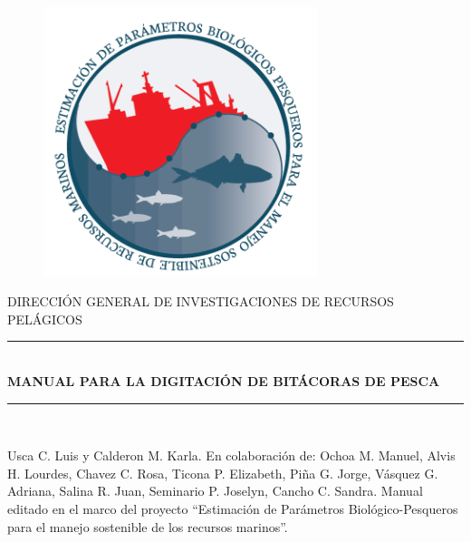 \documentclass[a4paper,oneside,11pt]{book}
\begin{document}
\begin{titlepage}


\begin{figure}
\centering
\includegraphics[width=8cm]{imagen_Manual_PBP/logo.png}
\end{figure}


\begin{center}
\vspace*{0.1in}
\large {DIRECCIÓN GENERAL DE INVESTIGACIONES DE RECURSOS PELÁGICOS} \\ 

\end{center}

\vspace*{0.6in}
\begin{large}
\end{large}
\vspace*{0.2in}
\begin{Large}
\begin{center}
\rule{150mm}{0.3mm}\\
\huge {\textbf{MANUAL PARA LA DIGITACIÓN DE BITÁCORAS DE PESCA}} \\
\rule{150mm}{0.3mm}\\
\end{center}
\end{Large}
\vspace*{0.1in}
\begin{large}
\end{large}
\vspace{60pt}

\noindent
\small{Usca C. Luis y Calderon M. Karla. En colaboración de: Ochoa M. Manuel, Alvis H. Lourdes, Chavez C. Rosa, Ticona P. Elizabeth, Piña G. Jorge, Vásquez G. Adriana, Salina R. Juan, Seminario P. Joselyn, Cancho C. Sandra.
Manual editado en el marco del proyecto “Estimación de Parámetros Biológico-Pesqueros para el manejo sostenible de los recursos marinos”.}\\
\vspace{10pt}
\begin{center}
\vspace*{0.1in}
\vspace*{0.1in}


\end{center}
\end{titlepage}
\end{document}

